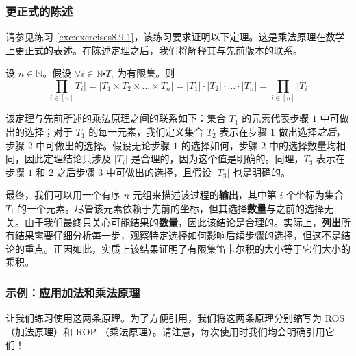 \subsubsection*{更正式的陈述}

请参见练习 \ref{exc:exercises8.9.1}，该练习要求证明以下定理。这是乘法原理在数学上更正式的表述。在陈述定理之后，我们将解释其与先前版本的联系。

\begin{theorem}\label{theorem8.2.10}
    设 $n \in \mathbb{N}$。假设 $\forall i \in \mathbb{N} \centerdot T_i$ 为有限集。则
    \[\Bigg|\prod_{i \in [n]} T_i \Bigg| = |T_1 \times T_2 \times \dots \times T_n| = |T_1| \cdot |T_2| \cdot \dots \cdot |T_n| = \prod_{i \in [n]} |T_i|\]
\end{theorem}

该定理与先前所述的乘法原理之间的联系如下：集合 $T_1$ 的元素代表步骤 $1$ 中可做出的选择；对于 $T_1$ 的每一元素，我们定义集合 $T_2$ 表示在步骤 $1$ 做出选择\emph{之后}，步骤 $2$ 中可做出的选择。假设无论步骤 $1$ 的选择如何，步骤 $2$ 中的选择数量均相同，因此定理结论只涉及 $|T_i|$ 是合理的，因为这个值是明确的。同理，$T_3$ 表示在步骤 $1$ 和 $2$ 之后步骤 $3$ 中可做出的选择，且假设 $|T_3|$ 也是明确的。

最终，我们可以用一个有序 $n$ 元组来描述该过程的\textbf{输出}，其中第 $i$ 个坐标为集合 $T_i$ 的一个元素。尽管该元素依赖于先前的坐标，但其选择\textbf{数量}与之前的选择无关。由于我们最终只关心可能结果的\textbf{数量}，因此该结论是合理的。实际上，\textbf{列出}所有结果需要仔细分析每一步，观察特定选择如何影响后续步骤的选择，但这不是结论的重点。正因如此，实质上该结果证明了有限集笛卡尔积的大小等于它们大小的乘积。

\subsubsection*{示例：应用加法和乘法原理}

让我们练习使用这两条原理。为了方便引用，我们将这两条原理分别缩写为 ROS （加法原理）和 ROP （乘法原理）。请注意，每次使用时我们均会明确引用它们！

